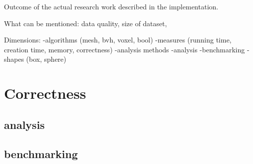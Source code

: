 \documentclass[11pt,twoside,a4paper]{report}
\begin{document}



Outcome of the actual research work described in the implementation.

What can be mentioned: data quality, size of dataset, 

Dimensions: 
-algorithms (mesh, bvh, voxel, bool)
-measures (running time, creation time, memory, correctness)
-analysis methods
  -analysis
  -benchmarking
    -shapes (box, sphere)
    
\section{Correctness}
\subsection{analysis}
\subsection{benchmarking}
\end{document}
